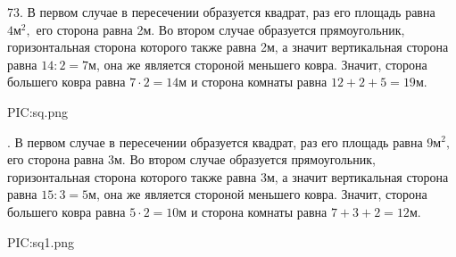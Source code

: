 73. В первом случае в пересечении образуется квадрат, раз его площадь равна $4\text{м}^2,$ его сторона равна 2м. Во втором случае образуется прямоугольник, горизонтальная сторона которого также равна 2м, а значит вертикальная сторона равна $14:2=7$м, она же является стороной меньшего ковра. Значит, сторона большего ковра равна $7\cdot2=14$м и сторона комнаты равна $12+2+5=19$м.
\begin{center}
{{PIC:sq.png}}
\end{center}
\newpage
{}. В первом случае в пересечении образуется квадрат, раз его площадь равна $9\text{м}^2,$ его сторона равна 3м. Во втором случае образуется прямоугольник, горизонтальная сторона которого также равна 3м, а значит вертикальная сторона равна $15:3=5$м, она же является стороной меньшего ковра. Значит, сторона большего ковра равна $5\cdot2=10$м и сторона комнаты равна $7+3+2=12$м.
\begin{center}
{{PIC:sq1.png}}
\end{center}
